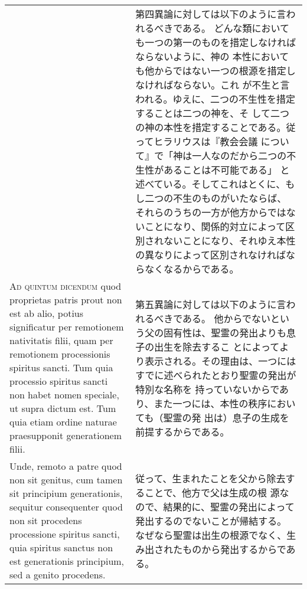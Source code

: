 \documentclass[10pt]{jsarticle} %
\begin{document}
\begin{longtable}{p{21em}p{21em}}
&

第四異論に対しては以下のように言われるべきである。
どんな類においても一つの第一のものを措定しなければならないように、神の
 本性においても他からではない一つの根源を措定しなければならない。これ
 が不生と言われる。ゆえに、二つの不生性を措定することは二つの神を、そ
 して二つの神の本性を措定することである。従ってヒラリウスは『教会会議
 について』で「神は一人なのだから二つの不生性があることは不可能である」
 と述べている。そしてこれはとくに、もし二つの不生のものがいたならば、
 それらのうちの一方が他方からではないことになり、関係的対立によって区
 別されないことになり、それゆえ本性の異なりによって区別されなければな
 らなくなるからである。



\\



{\scshape Ad quintum dicendum} quod proprietas patris prout non est ab alio,
potius significatur per remotionem nativitatis filii, quam per
remotionem processionis spiritus sancti. Tum quia processio spiritus
sancti non habet nomen speciale, ut supra dictum est. Tum quia etiam
ordine naturae praesupponit generationem filii. 

&

第五異論に対しては以下のように言われるべきである。
他からでないという父の固有性は、聖霊の発出よりも息子の出生を除去するこ
 とによってより表示される。その理由は、一つにはすでに述べられたとおり聖霊の発出が特別な名称を
 持っていないからであり、また一つには、本性の秩序においても（聖霊の発
 出は）息子の生成を前提するからである。


\\


Unde, remoto a patre
quod non sit genitus, cum tamen sit principium generationis, sequitur
consequenter quod non sit procedens processione spiritus sancti, quia
spiritus sanctus non est generationis principium, sed a genito
procedens.


&

従って、生まれたことを父から除去することで、他方で父は生成の根
 源なので、結果的に、聖霊の発出によって発出するのでないことが帰結する。
 なぜなら聖霊は出生の根源でなく、生み出されたものから発出するからであ
 る。


\end{longtable}
\newpage
\end{document}
